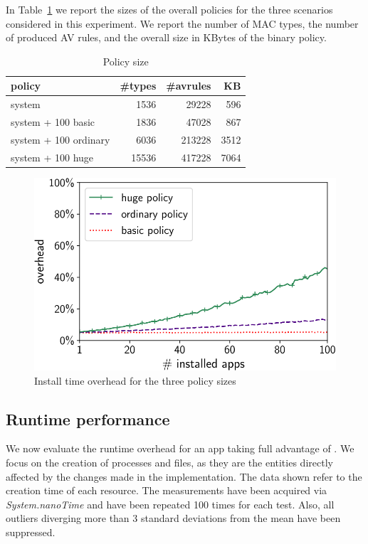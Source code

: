 In Table~\ref{tab:seapp_policy} we report the sizes of the overall
policies for the three scenarios considered in this experiment.  We
report the number of MAC types, the number of produced AV rules, and
the overall size in KBytes of the binary policy.
%
\begin{table}[h!]
	\centering
        \small
	\begin{tabular}{|l|r|r|r|}
		\hline
		\textbf{policy} & \textbf{\#types} & \textbf{\#avrules} & \textbf{KB} \\ \hline
		system & 1536 & 29228 &  596 \\ \hline
		system + 100 basic & 1836 & 47028 &  867 \\ \hline
		system + 100 ordinary & 6036 & 213228 &  3512 \\ \hline
		system + 100 huge & 15536 & 417228 &  7064 \\ \hline
	\end{tabular}
	\caption{Policy size}
	\label{tab:seapp_policy}
\end{table}
%
\begin{figure}[t]
	\centering
	\includegraphics[width=0.7\columnwidth]{chapters/seapp/data/overheads}
	\caption{\label{fig:seapp_install_time} Install time overhead for the three policy sizes}
\end{figure}


\subsection{Runtime performance}

We now evaluate the runtime overhead for an app taking full advantage
of \pap.  We focus on the creation of processes and files, as they are
the entities directly affected by the changes made in the
implementation.  The data shown refer to the creation time of each
resource.  The measurements have been acquired via
\textit{System.nanoTime} and have been repeated 100 times for each
test.  Also, all outliers diverging more than 3 standard deviations
from the mean have been suppressed.


